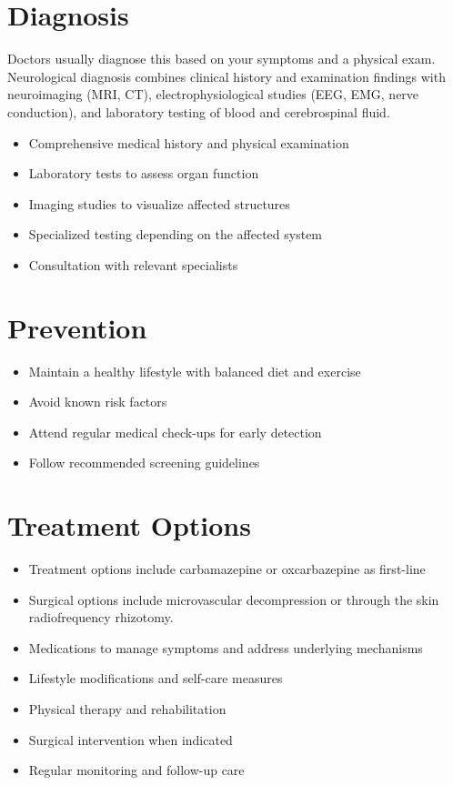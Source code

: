 \section{Diagnosis}
Doctors usually diagnose this based on your symptoms and a physical exam. Neurological diagnosis combines clinical history and examination findings with neuroimaging (MRI, CT), electrophysiological studies (EEG, EMG, nerve conduction), and laboratory testing of blood and cerebrospinal fluid.

\begin{itemize}[noitemsep]
  \item Comprehensive medical history and physical examination
  \item Laboratory tests to assess organ function
  \item Imaging studies to visualize affected structures
  \item Specialized testing depending on the affected system
  \item Consultation with relevant specialists
\end{itemize}
\section{Prevention}
\begin{itemize}[noitemsep]
  \item Maintain a healthy lifestyle with balanced diet and exercise
  \item Avoid known risk factors
  \item Attend regular medical check-ups for early detection
  \item Follow recommended screening guidelines
\end{itemize}
\section{Treatment Options}
\begin{itemize}[noitemsep]
  \item Treatment options include carbamazepine or oxcarbazepine as first-line
  \item Surgical options include microvascular decompression or through the skin radiofrequency rhizotomy.
  \item Medications to manage symptoms and address underlying mechanisms
  \item Lifestyle modifications and self-care measures
  \item Physical therapy and rehabilitation
  \item Surgical intervention when indicated
  \item Regular monitoring and follow-up care
\end{itemize}

